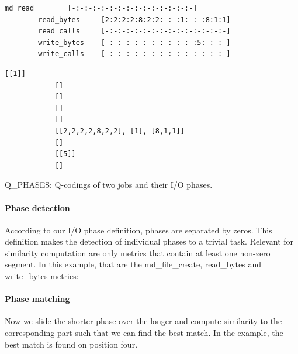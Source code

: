 \documentclass{jhps}
\begin{document}
\begin{listing}
\begin{minipage}{\textwidth}
\begin{minipage}{0.60\textwidth}
\begin{lstlisting}[basicstyle=\fontsize{8}{8}\ttfamily]
		md_read        [-:-:-:-:-:-:-:-:-:-:-:-:-:-:-]
		read_bytes     [2:2:2:2:8:2:2:-:-:1:-:-:8:1:1]
		read_calls     [-:-:-:-:-:-:-:-:-:-:-:-:-:-:-]
		write_bytes    [-:-:-:-:-:-:-:-:-:-:-:5:-:-:-]
		write_calls    [-:-:-:-:-:-:-:-:-:-:-:-:-:-:-]
		\end{lstlisting}
		\vspace{-2em}
		\label{lst:sim:pm_quant:job_b}
		\end{minipage}
		\noindent\begin{minipage}{0.39\textwidth}
			\begin{lstlisting}[basicstyle=\fontsize{8}{8}\ttfamily]
			[[1]]
			[]
			[]
			[]
			[]
			[[2,2,2,2,8,2,2], [1], [8,1,1]]
			[]
			[[5]]
			[]
			\end{lstlisting}
			\vspace{-2em}
			\label{lst:sim:pm_quant:phases:job_b}
		\end{minipage}
	\end{minipage}
	\caption{Q\_PHASES: Q-codings of two jobs and their I/O phases.}
	\label{lst:sim:pm_quant}
\end{listing}



\paragraph{Phase detection}
According to our I/O phase definition, phases are separated by zeros.
This definition makes the detection of individual phases to a trivial task.
Relevant for similarity computation are only metrics that contain at least one non-zero segment.
In this example, that are the md\_file\_create, read\_bytes and write\_bytes metrics:


\paragraph{Phase matching}
Now we slide the shorter phase over the longer and compute similarity to the corresponding part such that we can find the best match.
In the example, the best match is found on position four.
\end{document}
